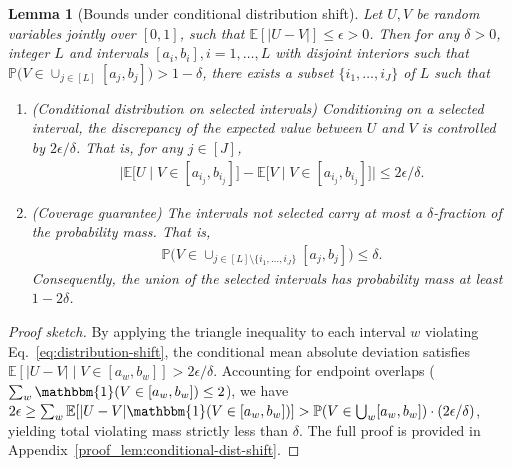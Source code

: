\documentclass[11pt]{article}
\theoremstyle{statplain}
\newtheorem{lemma}[theorem]{Lemma}
\theoremstyle{statdefinition}
\newenvironment{proofsketch}
  {\begin{proof}[Proof sketch]\renewcommand{\qedsymbol}{}}
  {\end{proof}}
\newcommand{\E}{\mathbb{E}}
\newcommand{\PP}{\mathbb{P}}
\newcommand{\0}{\mathbf{0}}
\newcommand{\numInterval}{J} %
\newcommand{\iteratorInterval}{j}
\begin{document}
\begin{lemma}[Bounds under conditional distribution shift]\label{lem:conditional-dist-shift}
Let $U,V$ be random variables jointly over $[0,1]$, such that $\E[|U-V|] \leq \epsilon > 0$. Then for any $\delta > 0$, integer $L$ and intervals $[a_i,b_i], i = 1,\dots, L$ with disjoint interiors such that $\PP\Big(V \in \cup_{j \in [L]} [a_j,b_j]\Big) > 1- \delta$, 
there exists a subset $\{i_1,\dots,i_\numInterval\}$ of $L$ such that
\begin{enumerate}
    \item \emph{(Conditional distribution on selected intervals)} Conditioning on a selected interval, the discrepancy of the expected value between $U$ and $V$ is controlled by $2\epsilon/\delta$.
 That is, for any $\iteratorInterval \in [\numInterval]$, 
    \begin{align}\label{eq:distribution-shift}
        \Big|\E\Big[U\mid V \in [a_{i_\iteratorInterval},b_{i_\iteratorInterval}]\Big] - \E\Big[V \mid V \in [a_{i_\iteratorInterval},b_{i_\iteratorInterval}]\Big]\Big| \leq 2\epsilon/\delta.
    \end{align}
    \item \emph{(Coverage guarantee)}
    The intervals not selected carry at most a $\delta$-fraction of the probability mass. That is,
\begin{align}\label{eq:distribution-shift-coverage}
        \PP\Big(V \in \cup_{\iteratorInterval \in [L] \setminus \{i_1,\dots,i_\numInterval\}} [a_\iteratorInterval,b_\iteratorInterval]\Big) \leq \delta.
    \end{align}
    Consequently, the union of the selected intervals has probability mass at least $1-2\delta$.
\end{enumerate}
\end{lemma}




\begin{proofsketch}
By applying the triangle inequality to each interval $w$ violating Eq.~\eqref{eq:distribution-shift}, the conditional mean absolute deviation satisfies $\mathbb{E}[\vert{}U - V\vert{} \mid V \in [a_w, b_w]] > 2\epsilon/\delta$. Accounting for endpoint overlaps ($\sum_w \mathbbm{1}(V \in [a_w, b_w]) \leq 2$), we have $2\epsilon \ge \sum_w \mathbb{E}[|U-V| \mathbbm{1}(V \in [a_w, b_w])] > \mathbb{P}(V \in \bigcup_w [a_w, b_w]) \cdot (2\epsilon/\delta)$, yielding total violating mass strictly less than $\delta$. The full proof is provided in Appendix~\ref{proof_lem:conditional-dist-shift}.
\end{proofsketch}
\end{document}
